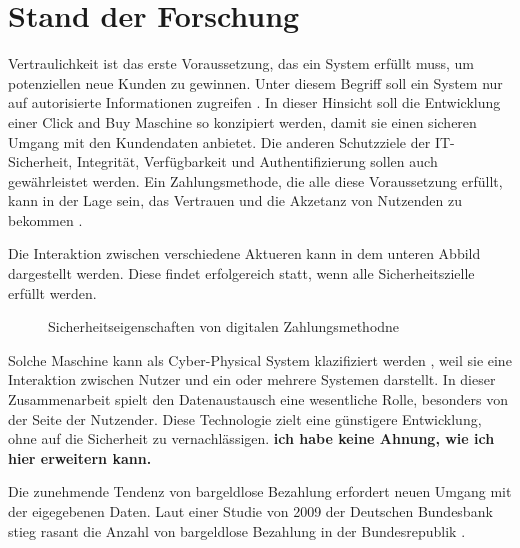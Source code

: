 \section{Stand der Forschung}

Vertraulichkeit ist das erste Voraussetzung, das ein System erfüllt muss, um potenziellen neue 
Kunden zu gewinnen. Unter diesem Begriff soll ein System nur auf autorisierte Informationen 
zugreifen \cite{refbook:SWIS}. In dieser Hinsicht soll die Entwicklung einer Click and Buy Maschine 
so konzipiert werden, damit sie einen sicheren Umgang mit den Kundendaten anbietet. Die anderen
Schutzziele der IT-Sicherheit, Integrität, Verfügbarkeit und Authentifizierung sollen auch gewährleistet
werden. Ein Zahlungsmethode, die alle diese Voraussetzung erfüllt, kann in der Lage sein, das Vertrauen
und die Akzetanz von Nutzenden zu bekommen \cite{refart:HARE}.

Die Interaktion zwischen verschiedene Aktueren kann in dem unteren Abbild dargestellt werden.
Diese findet erfolgereich statt, wenn alle Sicherheitszielle erfüllt werden.

\begin{figure}[htb]
    \caption{Sicherheitseigenschaften von digitalen Zahlungsmethodne}
    \label{fig:refark_HARE}
\end{figure}

Solche Maschine kann als Cyber-Physical System klazifiziert werden \cite{inbook:MHNS}, weil sie 
eine Interaktion zwischen Nutzer und ein oder mehrere Systemen darstellt. In dieser Zusammenarbeit
spielt den Datenaustausch eine wesentliche Rolle, besonders von der Seite der Nutzender. 
Diese Technologie zielt eine günstigere Entwicklung, ohne auf die Sicherheit zu vernachlässigen.
\textbf{ich habe keine Ahnung, wie ich hier erweitern kann.}


Die zunehmende Tendenz von bargeldlose Bezahlung erfordert neuen Umgang mit der eigegebenen Daten.
Laut einer Studie von 2009 der Deutschen Bundesbank stieg rasant die Anzahl von bargeldlose Bezahlung 
in der Bundesrepublik \cite{refrep:DBCP}.

